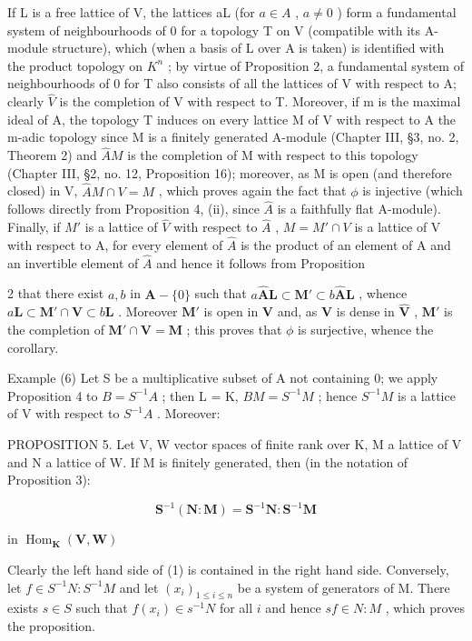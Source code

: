 If L is a free lattice of V, the lattices aL (for \(a \in A\) , \(a \neq 0\) ) form a fundamental system of neighbourhoods of 0 for a topology T on V (compatible with its A-module structure), which (when a basis of L over A is taken) is identified with the product topology on \(K^{n}\) ; by virtue of Proposition 2, a fundamental system of neighbourhoods of 0 for T also consists of all the lattices of V with respect to A; clearly \(\hat{V}\) is the completion of V with respect to T. Moreover, if m is the maximal ideal of A, the topology T induces on every lattice M of V with respect to A the m-adic topology since M is a finitely generated A-module (Chapter III, §3, no. 2, Theorem 2) and \(\hat{A}M\) is the completion of M with respect to this topology (Chapter III, §2, no. 12, Proposition 16); moreover, as M is open (and therefore closed) in V, \(\hat{A}M \cap V = M\) , which proves again the fact that \(\phi\) is injective (which follows directly from Proposition 4, (ii), since \(\hat{A}\) is a faithfully flat A-module). Finally, if \(M'\) is a lattice of \(\hat{V}\) with respect to \(\hat{A}\) , \(M = M' \cap V\) is a lattice of V with respect to A, for every element of \(\hat{A}\) is the product of an element of A and an invertible element of \(\hat{A}\) and hence it follows from Proposition

2 that there exist \(a, b\) in \(\mathbf{A} - \{0\}\) such that \(a\hat{\mathbf{A}}\mathbf{L} \subset \mathbf{M}' \subset b\hat{\mathbf{A}}\mathbf{L}\) , whence \(a\mathbf{L} \subset \mathbf{M}' \cap \mathbf{V} \subset b\mathbf{L}\) . Moreover \(\mathbf{M}'\) is open in \(\mathbf{V}\) and, as \(\mathbf{V}\) is dense in \(\hat{\mathbf{V}}\) , \(\mathbf{M}'\) is the completion of \(\mathbf{M}' \cap \mathbf{V} = \mathbf{M}\) ; this proves that \(\phi\) is surjective, whence the corollary.

Example (6) Let S be a multiplicative subset of A not containing 0; we apply Proposition 4 to \(B = S^{-1}A\) ; then L = K, \(BM = S^{-1}M\) ; hence \(S^{-1}M\) is a lattice of V with respect to \(S^{-1}A\) . Moreover:

PROPOSITION 5. Let V, W vector spaces of finite rank over K, M a lattice of V and N a lattice of W. If M is finitely generated, then (in the notation of Proposition 3):

\[
\mathbf {S} ^ {- 1} (\mathbf {N}: \mathbf {M}) = \mathbf {S} ^ {- 1} \mathbf {N}: \mathbf {S} ^ {- 1} \mathbf {M}\tag{1}
\]

in \(\operatorname{Hom}_{\mathbf{K}}(\mathbf{V},\mathbf{W})\)

Clearly the left hand side of (1) is contained in the right hand side. Conversely, let \(f \in S^{-1}N: S^{-1}M\) and let \((x_i)_{1 \leqslant i \leqslant n}\) be a system of generators of M. There exists \(s \in S\) such that \(f(x_i) \in s^{-1}N\) for all \(i\) and hence \(sf \in N: M\) , which proves the proposition.

